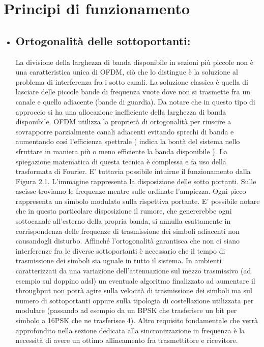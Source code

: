 \section{Principi di funzionamento}
\begin{itemize}
	 \item \subsection{Ortogonalità delle sottoportanti: } La divisione della larghezza di banda disponibile in sezioni più piccole non è una caratteristica unica di OFDM, ciò che lo distingue è la soluzione al problema di interferenza fra i sotto canali. La soluzione classica è quella di lasciare delle piccole bande di frequenza vuote dove non si trasmette fra un canale e quello adiacente (bande di guardia). Da notare che in questo tipo di approccio si ha una allocazione inefficiente della larghezza di banda disponibile. OFDM utilizza la proprietà di ortogonalità per riuscire a sovrapporre parzialmente canali adiacenti evitando sprechi di banda e aumentando così l'efficienza spettrale ( indica la bontà del sistema nello sfruttare in maniera più o meno efficiente la banda disponibile \cite{efficienzaSpettrale}).
	 La spiegazione matematica di questa tecnica è complessa e fa uso della trasformata di Fourier. E' tuttavia possibile intuirne il funzionamento dalla Figura 2.1. L'immagine rappresenta la disposizione delle sotto portanti. Sulle ascisse troviamo le frequenze mentre sulle ordinate l'ampiezza. Ogni picco rappresenta un simbolo modulato sulla rispettiva portante. E' possibile notare che in questa particolare disposizione il rumore, che genererebbe ogni sottocanale all'esterno della propria banda, si annulla esattamente in corrispondenza delle frequenze di trasmissione dei simboli adiacenti non causandogli disturbo. Affinché l'ortogonalità garantisca che non ci siano interferenze fra le diverse sottoportanti è necessario che il tempo di trasmissione dei simboli sia uguale in tutto il sistema. In ambienti caratterizzati da una variazione dell'attenuazione sul mezzo trasmissivo (ad esempio sul doppino adsl) un eventuale algoritmo finalizzato ad aumentare il throughput non potrà agire sulla velocità di trasmissione dei simboli ma sul numero di sottoportanti oppure sulla tipologia di costellazione utilizzata per modulare (passando ad esempio da un BPSK che trasferisce un bit per simbolo a 16PSK che ne trasferisce 4). Altro requisito fondamentale che verrà approfondito nella sezione dedicata alla sincronizzazione in frequenza è la necessità di avere un ottimo allineamento fra trasmettitore e ricevitore.
	 

\end{itemize}
